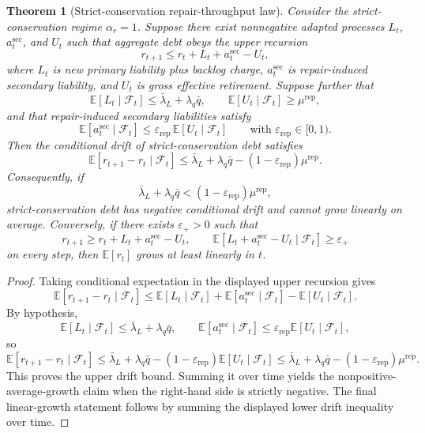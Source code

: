 \documentclass[11pt]{article}
\newtheorem{theorem}{Theorem}[section]
\theoremstyle{definition}
\newcommand{\E}{\mathbb{E}}
\newcommand{\1}{\mathbf{1}}
\newcommand{\eps}{\varepsilon}
\begin{document}
\begin{theorem}[Strict-conservation repair-throughput law]\label{thm:strict_conservation}
Consider the strict-conservation regime $\alpha_r=1$. Suppose there exist nonnegative adapted processes $L_t$, $a_t^{\mathrm{sec}}$, and $U_t$ such that aggregate debt obeys the upper recursion
\[
r_{t+1}\le r_t + L_t + a_t^{\mathrm{sec}} - U_t,
\]
where $L_t$ is new \emph{primary} liability plus backlog charge, $a_t^{\mathrm{sec}}$ is repair-induced secondary liability, and $U_t$ is gross effective retirement. Suppose further that
\[
\E[L_t\mid \mathcal F_t]\le \bar\lambda_L + \lambda_q \bar q,
\qquad
\E[U_t\mid \mathcal F_t]\ge \mu^{\mathrm{rep}},
\]
and that repair-induced secondary liabilities satisfy
\[
\E[a_t^{\mathrm{sec}}\mid \mathcal F_t] \le \eps_{\mathrm{rep}}\,\E[U_t\mid \mathcal F_t]
\qquad\text{with }\eps_{\mathrm{rep}}\in[0,1).
\]
Then the conditional drift of strict-conservation debt satisfies
\[
\E[r_{t+1}-r_t\mid\mathcal F_t]
\le
\bar\lambda_L + \lambda_q \bar q - (1-\eps_{\mathrm{rep}})\mu^{\mathrm{rep}}.
\]
Consequently, if
\[
\bar\lambda_L + \lambda_q \bar q < (1-\eps_{\mathrm{rep}})\mu^{\mathrm{rep}},
\]
strict-conservation debt has negative conditional drift and cannot grow linearly on average. Conversely, if there exists $\varepsilon_{+}>0$ such that
\[
r_{t+1}\ge r_t + L_t + a_t^{\mathrm{sec}} - U_t,
\qquad
\E[L_t+a_t^{\mathrm{sec}}-U_t\mid\mathcal F_t]\ge \varepsilon_{+}
\]
on every step, then $\E[r_t]$ grows at least linearly in $t$.
\end{theorem}

\begin{proof}
Taking conditional expectation in the displayed upper recursion gives
\[
\E[r_{t+1}-r_t\mid\mathcal F_t]
\le
\E[L_t\mid\mathcal F_t]+\E[a_t^{\mathrm{sec}}\mid\mathcal F_t]-\E[U_t\mid\mathcal F_t].
\]
By hypothesis,
\[
\E[L_t\mid\mathcal F_t]\le \bar\lambda_L+\lambda_q\bar q,
\qquad
\E[a_t^{\mathrm{sec}}\mid\mathcal F_t]\le \eps_{\mathrm{rep}}\E[U_t\mid\mathcal F_t],
\]
so
\[
\E[r_{t+1}-r_t\mid\mathcal F_t]
\le
\bar\lambda_L+\lambda_q\bar q-(1-\eps_{\mathrm{rep}})\E[U_t\mid\mathcal F_t]
\le
\bar\lambda_L+\lambda_q\bar q-(1-\eps_{\mathrm{rep}})\mu^{\mathrm{rep}}.
\]
This proves the upper drift bound. Summing it over time yields the nonpositive-average-growth claim when the right-hand side is strictly negative. The final linear-growth statement follows by summing the displayed lower drift inequality over time.
\end{proof}
\end{document}
